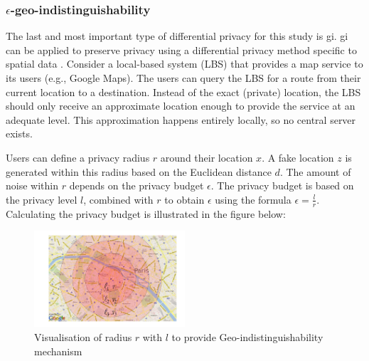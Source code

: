 \subsubsection{$\epsilon$-geo-indistinguishability} \label{theory:geo-indistinguishability}
The last and most important type of differential privacy for this study is \gls{gi}.
\gls{gi} can be applied to preserve privacy using a differential privacy method specific to spatial data \citep{DBLP:journals/corr/abs-1212-1984}.
Consider a local-based system (LBS) that provides a map service to its users (e.g., Google Maps).
The users can query the LBS for a route from their current location to a destination.
Instead of the exact (private) location, the LBS should only receive an approximate location enough to provide the service at an adequate level.
This approximation happens entirely locally, so no central server exists.

Users can define a privacy radius $r$ around their location $x$.
A fake location $z$ is generated within this radius based on the Euclidean distance $d$. \newline
The amount of noise within $r$ depends on the privacy budget $\epsilon$.
The privacy budget is based on the privacy level $l$, combined with $r$ to obtain $\epsilon$ using the formula $\epsilon = \frac{l}{r}$. \newline
Calculating the privacy budget is illustrated in the figure below:
\begin{figure}[H]
  \includegraphics[width=0.5\textwidth]{TheorethicalFramework/geo-indistinguishability.png}
  \caption{Visualisation of radius $r$ with $l$ to provide Geo-indistinguishability mechanism \citep{DBLP:journals/corr/abs-1212-1984}}
  \label{fig:geo-indistinguishability}
\end{figure}

